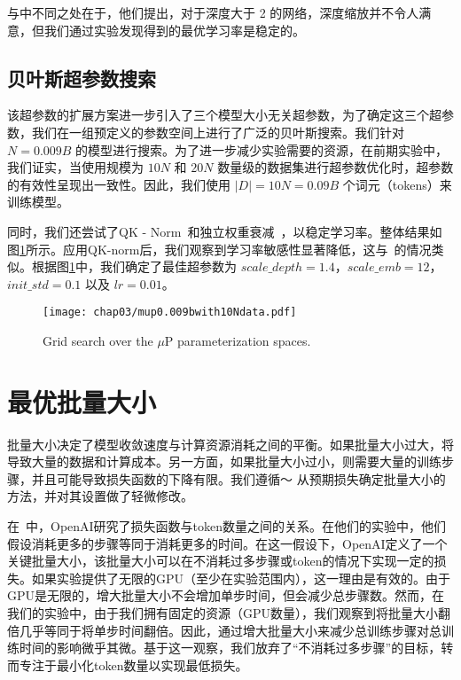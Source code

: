 与\cite{yang2023tensor}中不同之处在于，他们提出，对于深度大于 2 的网络，深度缩放并不令人满意，但我们通过实验发现得到的最优学习率是稳定的。

\subsection{贝叶斯超参数搜索}
该超参数的扩展方案进一步引入了三个模型大小无关超参数，为了确定这三个超参数，我们在一组预定义的参数空间上进行了广泛的贝叶斯搜索。我们针对 $N = 0.009B$ 的模型进行搜索。为了进一步减少实验需要的资源，在前期实验中，我们证实，当使用规模为 $10N$ 和 $20N$ 数量级的数据集进行超参数优化时，超参数的有效性呈现出一致性。因此，我们使用 $|D| = 10N = 0.09B$ 个词元（tokens）来训练模型。

同时，我们还尝试了QK - Norm~\citep{henry-etal-2020-query}和独立权重衰减~\citep{loshchilov2017decoupled}，以稳定学习率。整体结果如图\ref{fig:mupsearch_app}所示。应用QK-norm后，我们观察到学习率敏感性显著降低，这与~\cite{wortsman2023small}的情况类似。根据图\ref{fig:mupsearch_app}中，我们确定了最佳超参数为 $scale\_depth = 1.4$，$scale\_emb = 12$，$init\_std = 0.1$ 以及 $lr = 0.01$。


\begin{figure}[htbp]
  \centering
  \texttt{[image: chap03/mup0.009bwith10Ndata.pdf]}
  \caption{Grid search over the $\mu$P parameterization spaces.}
  \label{fig:mupsearch_app}
\end{figure}

\section{最优批量大小}

批量大小决定了模型收敛速度与计算资源消耗之间的平衡。如果批量大小过大，将导致大量的数据和计算成本。另一方面，如果批量大小过小，则需要大量的训练步骤，并且可能导致损失函数的下降有限。我们遵循～\cite{kaplan2020scaling} 从预期损失确定批量大小的方法，并对其设置做了轻微修改。


在~\cite{kaplan2020scaling}中，OpenAI研究了损失函数与token数量之间的关系。在他们的实验中，他们假设消耗更多的步骤等同于消耗更多的时间。在这一假设下，OpenAI定义了一个关键批量大小，该批量大小可以在不消耗过多步骤或token的情况下实现一定的损失。如果实验提供了无限的GPU（至少在实验范围内），这一理由是有效的。由于GPU是无限的，增大批量大小不会增加单步时间，但会减少总步骤数。然而，在我们的实验中，由于我们拥有固定的资源（GPU数量），我们观察到将批量大小翻倍几乎等同于将单步时间翻倍。因此，通过增大批量大小来减少总训练步骤对总训练时间的影响微乎其微。基于这一观察，我们放弃了“不消耗过多步骤”的目标，转而专注于最小化token数量以实现最低损失。

